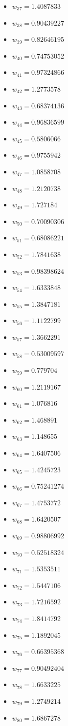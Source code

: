 \documentclass[11pt]{article}
\begin{document}
\begin{itemize}
\item $w_{37} = 1.4087833$
\item $w_{38} = 0.90439227$
\item $w_{39} = 0.82646195$
\item $w_{40} = 0.74753052$
\item $w_{41} = 0.97324866$
\item $w_{42} = 1.2773578$
\item $w_{43} = 0.68374136$
\item $w_{44} = 0.96836599$
\item $w_{45} = 0.5806066$
\item $w_{46} = 0.9755942$
\item $w_{47} = 1.0858708$
\item $w_{48} = 1.2120738$
\item $w_{49} = 1.727184$
\item $w_{50} = 0.70090306$
\item $w_{51} = 0.68086221$
\item $w_{52} = 1.7841638$
\item $w_{53} = 0.98398624$
\item $w_{54} = 1.6333848$
\item $w_{55} = 1.3847181$
\item $w_{56} = 1.1122799$
\item $w_{57} = 1.3662291$
\item $w_{58} = 0.53009597$
\item $w_{59} = 0.779704$
\item $w_{60} = 1.2119167$
\item $w_{61} = 1.076816$
\item $w_{62} = 1.468891$
\item $w_{63} = 1.148655$
\item $w_{64} = 1.6407506$
\item $w_{65} = 1.4245723$
\item $w_{66} = 0.75241274$
\item $w_{67} = 1.4753772$
\item $w_{68} = 1.6420507$
\item $w_{69} = 0.98806992$
\item $w_{70} = 0.52518324$
\item $w_{71} = 1.5353511$
\item $w_{72} = 1.5447106$
\item $w_{73} = 1.7216592$
\item $w_{74} = 1.8414792$
\item $w_{75} = 1.1892045$
\item $w_{76} = 0.66395368$
\item $w_{77} = 0.90492404$
\item $w_{78} = 1.6633225$
\item $w_{79} = 1.2749214$
\item $w_{80} = 1.6867278$
\end{itemize}
\end{document}
